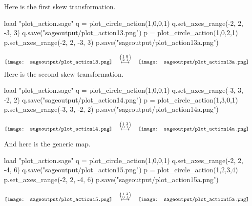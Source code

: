 Here is the first skew
transformation. 
\begin{sageoutput}[d,0,4;d,5,7]
load "plot_action.sage"
q = plot_circle_action(1,0,0,1) 
q.set_axes_range(-2, 2, -3, 3) 
q.save("sageoutput/plot_action13.png")
p = plot_circle_action(1,0,2,1) 
p.set_axes_range(-2, 2, -3, 3) 
p.save("sageoutput/plot_action13a.png")
\end{sageoutput}
\begin{equation*}
  \vcenteredhbox{\texttt{[image: sageoutput/plot\_action13.png]}}
  \quad\mapsunder{\big (\begin{smallmatrix} 1 &0 \\ 2 &1 \end{smallmatrix}\big )}\quad
  \vcenteredhbox{\texttt{[image: sageoutput/plot\_action13a.png]}}
\end{equation*}
\noindent Here is the second skew
transformation. 
\begin{sageoutput}[d,0,4;d,5,7]
load "plot_action.sage"
q = plot_circle_action(1,0,0,1) 
q.set_axes_range(-3, 3, -2, 2) 
q.save("sageoutput/plot_action14.png")
p = plot_circle_action(1,3,0,1) 
p.set_axes_range(-3, 3, -2, 2) 
p.save("sageoutput/plot_action14a.png")
\end{sageoutput}
\begin{equation*}
  \vcenteredhbox{\texttt{[image: sageoutput/plot\_action14.png]}}
  \quad\mapsunder{\big (\begin{smallmatrix} 1 &3 \\ 0 &1 \end{smallmatrix}\big )}\quad
  \vcenteredhbox{\texttt{[image: sageoutput/plot\_action14a.png]}}
\end{equation*}

And here is the generic map.
\begin{sageoutput}[d,0,4;d,5,7]
load "plot_action.sage"
q = plot_circle_action(1,0,0,1) 
q.set_axes_range(-2, 2, -4, 6) 
q.save("sageoutput/plot_action15.png")
p = plot_circle_action(1,2,3,4) 
p.set_axes_range(-2, 2, -4, 6) 
p.save("sageoutput/plot_action15a.png")
\end{sageoutput}
\begin{equation*}
  \vcenteredhbox{\texttt{[image: sageoutput/plot\_action15.png]}}
  \quad\mapsunder{\big (\begin{smallmatrix} 1 &3 \\ 0 &1 \end{smallmatrix}\big )}\quad
  \vcenteredhbox{\texttt{[image: sageoutput/plot\_action15a.png]}}
\end{equation*}



